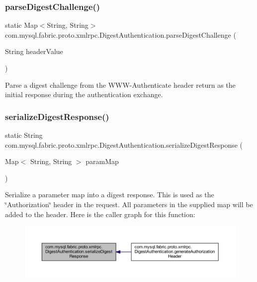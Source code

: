 \subsubsection{\texorpdfstring{parse\+Digest\+Challenge()}{parseDigestChallenge()}}
{\footnotesize\ttfamily static Map$<$String, String$>$ com.\+mysql.\+fabric.\+proto.\+xmlrpc.\+Digest\+Authentication.\+parse\+Digest\+Challenge (\begin{DoxyParamCaption}\item[{String}]{header\+Value }\end{DoxyParamCaption})\hspace{0.3cm}{\ttfamily [static]}}

Parse a digest challenge from the W\+W\+W-\/\+Authenticate header return as the initial response during the authentication exchange. \mbox{\label{classcom_1_1mysql_1_1fabric_1_1proto_1_1xmlrpc_1_1_digest_authentication_a49b053a5230a3da6f09e04dc411b43a9}} 
\subsubsection{\texorpdfstring{serialize\+Digest\+Response()}{serializeDigestResponse()}}
{\footnotesize\ttfamily static String com.\+mysql.\+fabric.\+proto.\+xmlrpc.\+Digest\+Authentication.\+serialize\+Digest\+Response (\begin{DoxyParamCaption}\item[{Map$<$ String, String $>$}]{param\+Map }\end{DoxyParamCaption})\hspace{0.3cm}{\ttfamily [static]}}

Serialize a parameter map into a digest response. This is used as the \char`\"{}\+Authorization\char`\"{} header in the request. All parameters in the supplied map will be added to the header. Here is the caller graph for this function\+:\nopagebreak
\begin{figure}[H]
\begin{center}
\leavevmode
\includegraphics[width=350pt]{classcom_1_1mysql_1_1fabric_1_1proto_1_1xmlrpc_1_1_digest_authentication_a49b053a5230a3da6f09e04dc411b43a9_icgraph}
\end{center}
\end{figure}


